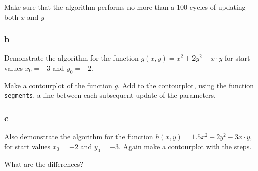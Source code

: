 \documentclass[]{article}
\begin{document}
Make sure that the algorithm performs no more than a \(100\) cycles of
updating both \(x\) and \(y\)

\hypertarget{b-11}{%
\subsubsection{b}\label{b-11}}

Demonstrate the algorithm for the function
\(g(x, y) = x^2 + 2y^2 - x\cdot y\) for start values \(x_0 = -3\) and
\(y_0 = -2\).

Make a contourplot of the function \(g\). Add to the contourplot, using
the function \texttt{segments}, a line between each subsequent update of
the parameters.

\hypertarget{c-11}{%
\subsubsection{c}\label{c-11}}

Also demonstrate the algorithm for the function
\(h(x, y) = 1.5x^2 + 2y^2 - 3x\cdot y\), for start values \(x_0 = -2\)
and \(y_0 = -3\). Again make a contourplot with the steps.

What are the differences?
\end{document}
